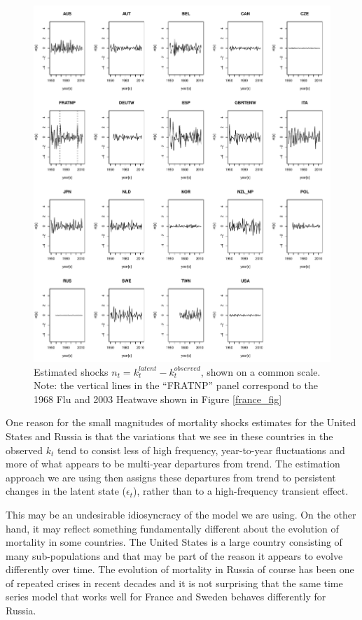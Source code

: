 \documentclass[12pt]{article}
\begin{document}
\begin{figure}
  \includegraphics[width=1.05\textwidth]{./../code/nt_panel_plot.pdf}
  \caption{Estimated shocks $n_t = k_t^{latent} - k_t^{observed}$,
    shown on a common scale. Note: the vertical lines in the
    ``FRATNP'' panel correspond to the 1968 Flu and 2003 Heatwave
    shown in Figure \ref{france_fig}}
    \label{nt_panel_fig}
\end{figure}


One reason for the small magnitudes of mortality shocks estimates for
the United States and Russia is that the variations that we see in
these countries in the observed $k_t$ tend to consist less of high
frequency, year-to-year fluctuations and more of what appears to be
multi-year departures from trend. The estimation approach we are using
then assigns these departures from trend to persistent changes in the
latent state ($\epsilon_t$), rather than to a high-frequency transient effect.

This may be an undesirable idiosyncracy of the model we are using. On
the other hand, it may reflect something fundamentally different about
the evolution of mortality in some countries. The United States is a
large country consisting of many sub-populations and that may be part of
the reason it appears to evolve differently over time. The evolution
of mortality in Russia of course has been one of repeated crises in
recent decades and it is not surprising that the same time series
model that works well for France and Sweden behaves differently for
Russia.
\end{document}
